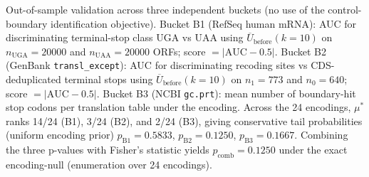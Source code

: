Out-of-sample validation across three independent buckets (no use of the control-boundary identification objective). Bucket B1 (RefSeq human mRNA): AUC for discriminating terminal-stop class $\mathrm{UGA}$ vs $\mathrm{UAA}$ using $\overline{U}_{\mathrm{before}}(k=10)$ on $n_\mathrm{UGA}=20000$ and $n_\mathrm{UAA}=20000$ ORFs; score $=|\mathrm{AUC}-0.5|$. Bucket B2 (GenBank \texttt{transl\_except}): AUC for discriminating recoding sites vs CDS-deduplicated terminal stops using $\overline{U}_{\mathrm{before}}(k=10)$ on $n_1=773$ and $n_0=640$; score $=|\mathrm{AUC}-0.5|$. Bucket B3 (NCBI \texttt{gc.prt}): mean number of boundary-hit stop codons per translation table under the encoding. Across the 24 encodings, $\mu^\ast$ ranks 14/24 (B1), 3/24 (B2), and 2/24 (B3), giving conservative tail probabilities (uniform encoding prior) $p_\mathrm{B1}=0.5833$, $p_\mathrm{B2}=0.1250$, $p_\mathrm{B3}=0.1667$. Combining the three p-values with Fisher's statistic yields $p_\mathrm{comb}=0.1250$ under the exact encoding-null (enumeration over 24 encodings).
